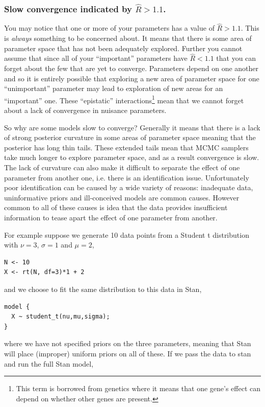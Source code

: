 \documentclass[11pt,fullpage]{book}
\begin{document}
\subsubsection{Slow convergence indicated by $\hat{R} > 1.1$.} You may notice that one or more of your parameters has a value of $\hat{R}>1.1$. This is \textit{always} something to be concerned about. It means that there is some area of parameter space that has not been adequately explored. Further you cannot assume that since all of your ``important'' parameters have $\hat{R} < 1.1$ that you can forget about the few that are yet to converge. Parameters depend on one another and so it is entirely possible that exploring a new area of parameter space for one ``unimportant'' parameter may lead to exploration of new areas for an ``important'' one. These ``epistatic'' interactions\footnote{This term is borrowed from genetics where it means that one gene's effect can depend on whether other genes are present.} mean that we cannot forget about a lack of convergence in nuisance parameters.

So why are some models slow to converge? Generally it means that there is a lack of strong posterior curvature in some areas of parameter space meaning that the posterior has long thin tails. These extended tails mean that MCMC samplers take much longer to explore parameter space, and as a result convergence is slow. The lack of curvature can also make it difficult to separate the effect of one parameter from another one, i.e. there is an identification issue. Unfortunately poor identification can be caused by a wide variety of reasons: inadequate data, uninformative priors and ill-conceived models are common causes. However common to all of these causes is idea that the data provides insufficient information to tease apart the effect of one parameter from another.

For example suppose we generate 10 data points from a Student t distribution with $\nu=3$, $\sigma=1$ and $\mu=2$,

\begin{verbatim}
N <- 10
X <- rt(N, df=3)*1 + 2
\end{verbatim}

and we choose to fit the same distribution to this data in Stan,

\begin{verbatim}
model { 
  X ~ student_t(nu,mu,sigma);
}
\end{verbatim}

where we have not specified priors on the three parameters, meaning that Stan will place (improper) uniform priors on all of these. If we pass the data to stan and run the full Stan model,
\end{document}
